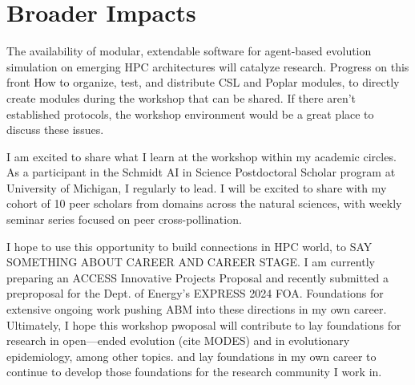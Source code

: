 \section{Broader Impacts}

The availability of modular, extendable software for agent-based evolution simulation on emerging HPC architectures will catalyze research.
Progress on this front
How to organize, test, and distribute CSL and Poplar modules, to directly create modules during the workshop that can be shared.
If there aren’t established protocols, the workshop environment would be a great place to discuss these issues.

I am excited to share what I learn at the workshop within my academic circles.
As a participant in the Schmidt AI in Science Postdoctoral Scholar program at University of Michigan, I regularly to lead.
I will be excited to share with my cohort of 10 peer scholars from domains across the natural sciences, with weekly seminar series focused on peer cross-pollination.

I hope to use this opportunity to build connections in HPC world, to SAY SOMETHING ABOUT CAREER AND CAREER STAGE.
I am currently preparing an ACCESS Innovative Projects Proposal and recently submitted a preproposal for the Dept. of Energy's EXPRESS 2024 FOA.
Foundations for extensive ongoing work pushing ABM into these directions in my own career.
Ultimately, I hope this workshop pwoposal will contribute to lay foundations for research in open—ended evolution (cite MODES) and in evolutionary epidemiology, among other topics. and lay foundations in my own career to continue to develop those foundations for the research community I work in.


